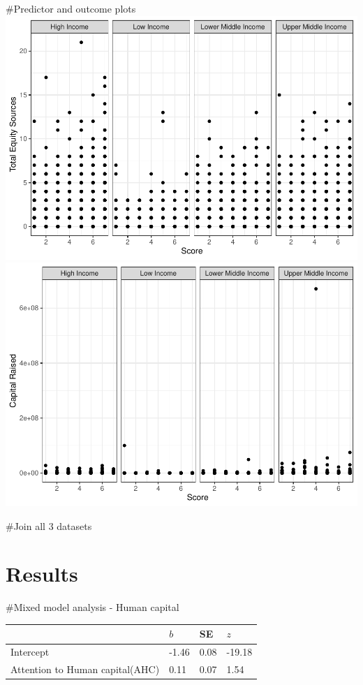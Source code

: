 \documentclass[
  english,
  man]{apa6}
\begin{document}
\#Predictor and outcome plots
\includegraphics{Manuscript_files/figure-latex/unnamed-chunk-11-1.pdf} \includegraphics{Manuscript_files/figure-latex/unnamed-chunk-11-2.pdf}

\#Join all 3 datasets

\hypertarget{results}{%
\section{Results}\label{results}}

\#Mixed model analysis - Human capital

\begin{tabular}{l|l|l|l}
\hline
  & $b$ & SE & $z$\\
\hline
Intercept & -1.46 & 0.08 & -19.18\\
\hline
Attention to Human capital(AHC) & 0.11 & 0.07 & 1.54\\
\hline
\end{tabular}
\end{document}

